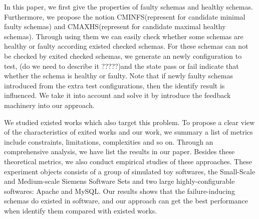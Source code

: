 \documentclass[10pt,journal,cspaper,compsoc]{IEEEtran}
\begin{document}
%

In this paper, we first give the properties of faulty schemas and healthy schemas. Furthermore, we propose the notion CMINFS(represent for candidate minimal faulty schemas) and CMAXHS(represent for candidate maximal healthy schemas). Through using them we can easily check whether some schemas are healthy or faulty according existed checked schemas. For these schemas can not be checked by exited checked schemas, we generate an newly configuration to test, (do we need to describe  it ?????)and the state pass or fail indicate that whether the schema is healthy or faulty. Note that if newly faulty schemas introduced from the extra test configurations, then the identify result is influenced. We take it into account and solve it by introduce the feedback machinery into our approach.

We studied existed works which also target this problem. To propose a clear view of the characteristics of exited works and our work, we  summary a list of metrics include constraints, limitations, complexities and so on. Through an comprehensive analysis, we have list the results in our paper. Besides these theoretical metrics, we also conduct empirical studies of these approaches. These experiment objects consists of a group of simulated toy softwares, the Small-Scale and Medium-scale Siemens Software Sets and two large highly-configurable softwares: Apache and MySQL. Our results shows that the failure-inducing schemas do existed in software, and our approach can get the best performance when identify them compared with existed works.
\end{document}
